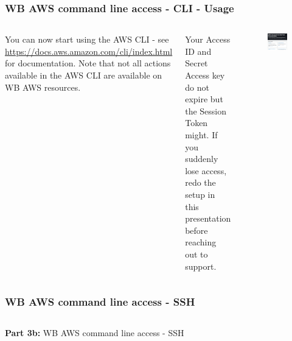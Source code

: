 \documentclass[aspectratio=169]{beamer} %
\begin{document}
\begin{frame}
	\frametitle{WB AWS command line access - CLI - Usage}
	\begin{columns}[c]
		
		You can now start using the AWS CLI - see
		\url{https://docs.aws.amazon.com/cli/index.html}
		for documentation. 
		Note that not all actions available in the AWS CLI 
		are available on WB AWS resources.
		
		\vspace{.5cm}
		
		Your Access ID and Secret Access key do not expire
		but the Session Token might.
		If you suddenly lose access, 
		redo the setup in this presentation before
		reaching out to support.

		
		\begin{figure}
			\centering
			\includegraphics[width=1\textwidth]{./img/aws-cli-documentation.png}
		\end{figure}
		
	\end{columns}
\end{frame}

\begin{frame}
	\frametitle{WB AWS command line access - SSH}
	\begin{columns}[c]
		
		
		\textbf{Part 3b:} WB AWS command line access - SSH
		
	\end{columns}
\end{frame}
\end{document}
